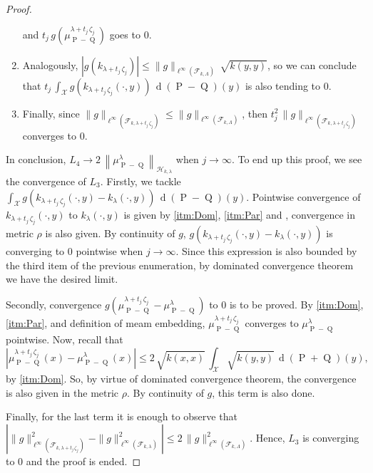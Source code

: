 \begin{proof}
\begin{enumerate}
\begin{equation}
					\end{equation}
					and $t_{j}\,g\left(\mu_{\operatorname{P}-\operatorname{Q}}^{\lambda+t_{j}\,\zeta_{j}}\right)$ goes to $0$.
					\item Analogously, $\left|g\left(k_{\lambda+t_{j}\,\zeta_{j}}\right)\right|\leq\|g\|_{\ell^{\infty}\left(\mathcal{F}_{k,\Lambda}\right)}\,\sqrt{k(y,y)}$, so we can conclude that $\displaystyle t_{j}\,\int_{\mathcal{X}}g\left(k_{\lambda+t_{j}\,\zeta_{j}}(\cdot,y)\right)\,\operatorname{d}(\operatorname{P}-\operatorname{Q})(y)$ is also tending to $0$.
					\item Finally, since $\|g\|_{\ell^{\infty}\left(\mathcal{F}_{k,\lambda+t_{j}\,\zeta_{j}}\right)}\leq\|g\|_{\ell^{\infty}\left(\mathcal{F}_{k,\Lambda}\right)}$, then $t_{j}^{2}\,\|g\|_{\ell^{\infty}\left(\mathcal{F}_{k,\lambda+t_{j}\,\zeta_{j}}\right)}$ converges to $0$.
				\end{enumerate}
				In conclusion, $L_{4}\longrightarrow2\,\left\|\mu_{\operatorname{P}-\operatorname{Q}}^{\lambda}\right\|_{\mathcal{H}_{k,\lambda}}$ when $j\longrightarrow\infty$. To end up this proof, we see the convergence of $L_{3}$. Firstly, we tackle $\displaystyle\int_{\mathcal{X}}g\left(k_{\lambda+t_{j}\,\zeta_{j}}(\cdot,y)-k_{\lambda}(\cdot,y)\right)\,\operatorname{d}(\operatorname{P}-\operatorname{Q})(y)$. Pointwise convergence of $k_{\lambda+t_{j}\,\zeta_{j}}(\cdot,y)$ to $k_{\lambda}(\cdot,y)$ is given by \ref{itm:Dom}, \ref{itm:Par} and \textcite[Theorem 2.27]{Folland2013}, convergence in metric $\rho$ is also given. By continuity of $g$, $g\left(k_{\lambda+t_{j}\,\zeta_{j}}(\cdot,y)-k_{\lambda}(\cdot,y)\right)$ is converging to $0$ pointwise when $j\longrightarrow\infty$. Since this expression is also bounded by the third item of the previous enumeration, by dominated convergence theorem we have the desired limit.
				
				Secondly, convergence $g\left(\mu_{\operatorname{P}-\operatorname{Q}}^{\lambda+t_{j}\,\zeta_{j}}-\mu_{\operatorname{P}-\operatorname{Q}}^{\lambda}\right)$ to $0$ is to be proved. By \ref{itm:Dom}, \ref{itm:Par}, and definition of meam embedding, $\mu_{\operatorname{P}-\operatorname{Q}}^{\lambda+t_{j}\,\zeta_{j}}$ converges to $\mu_{\operatorname{P}-\operatorname{Q}}^{\lambda}$ pointwise. Now, recall that
				\begin{equation}
					\left|\mu_{\operatorname{P}-\operatorname{Q}}^{\lambda+t_{j}\,\zeta_{j}}(x)-\mu_{\operatorname{P}-\operatorname{Q}}^{\lambda}(x)\right|\leq2\,\sqrt{k(x,x)}\,\int_{\mathcal{X}}\sqrt{k(y,y)}\,\operatorname{d}(\operatorname{P}+\operatorname{Q})(y),
				\end{equation}
				by \ref{itm:Dom}. So, by virtue of dominated convergence theorem, the convergence is also given in the metric $\rho$. By continuity of $g$, this term is also done.
				
				Finally, for the last term it is enough to observe that $\left|\|g\|_{\ell^{\infty}\left(\mathcal{F}_{k,\lambda+t_{j}\,\zeta_{j}}\right)}^{2}-\|g\|_{\ell^{\infty}\left(\mathcal{F}_{k,\lambda}\right)}^{2}\right|\leq2\,\|g\|_{\ell^{\infty}\left(\mathcal{F}_{k,\Lambda}\right)}^{2}$. Hence, $L_{3}$ is converging to $0$ and the proof is ended.
			\end{proof}
